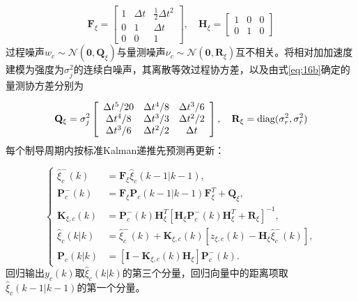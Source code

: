 \begin{equation}
\label{eq:62c}
{{\mathbf{F}}_\xi } = \left[ {\begin{array}{*{20}{c}}
  1&{\Delta t}&{\tfrac{1}{2}\Delta {t^2}} \\ 
  0&1&{\Delta t} \\ 
  0&0&1 
\end{array}} \right],\quad {{\mathbf{H}}_\xi } = \left[ {\begin{array}{*{20}{c}}
  1&0&0 \\ 
  0&1&0 
\end{array}} \right]
\end{equation}
过程噪声${w_c}\sim \mathcal{N}({\mathbf{0}},{{\mathbf{Q}}_\xi })$与量测噪声${\nu _c}\sim \mathcal{N}({\mathbf{0}},{{\mathbf{R}}_\xi })$互不相关。将相对加加速度建模为强度为$\sigma _j^2$的连续白噪声，其离散等效过程协方差，以及由式\eqref{eq:16b}确定的量测协方差分别为\cite{barshalom2001}

\begin{equation}
\label{eq:62d}
{{\mathbf{Q}}_\xi } = \sigma _j^2\left[ {\begin{array}{*{20}{c}}
  {\Delta {t^5}/20}&{\Delta {t^4}/8}&{\Delta {t^3}/6} \\ 
  {\Delta {t^4}/8}&{\Delta {t^3}/3}&{\Delta {t^2}/2} \\ 
  {\Delta {t^3}/6}&{\Delta {t^2}/2}&{\Delta t} 
\end{array}} \right],\quad {{\mathbf{R}}_\xi } = \diag(\sigma _r^2,\sigma _{\dot r}^2)
\end{equation}
每个制导周期内按标准Kalman递推先预测再更新\cite{barshalom2001}：

\begin{equation}
\label{eq:62e}
\left\{
\begin{aligned}
\hat \xi _c^-(k) &= {{\mathbf{F}}_\xi }{{\hat \xi }_c}(k - 1|k - 1),\\
{\mathbf{P}}_c^-(k) &= {{\mathbf{F}}_\xi }{{\mathbf{P}}_c}(k - 1|k - 1){\mathbf{F}}_\xi ^T + {{\mathbf{Q}}_\xi },\\
{{\mathbf{K}}_{\xi ,c}}(k) &= {\mathbf{P}}_c^-(k){\mathbf{H}}_\xi ^T
\left[ {\mathbf{H}}_\xi {\mathbf{P}}_c^-(k){\mathbf{H}}_\xi ^T + {\mathbf{R}}_\xi \right]^{-1},\\
{{\hat \xi }_c}(k|k) &= \hat \xi _c^-(k)+{{\mathbf{K}}_{\xi ,c}}(k)
\left[ {z_{\xi ,c}}(k)-{{\mathbf{H}}_\xi }\hat \xi _c^-(k) \right],\\
{{\mathbf{P}}_c}(k|k) &= \left[ {\mathbf{I}}-{{\mathbf{K}}_{\xi ,c}}(k){{\mathbf{H}}_\xi } \right]{\mathbf{P}}_c^-(k).
\end{aligned}
\right.
\end{equation}
回归输出${y_c}(k)$取${\hat \xi _c}(k|k)$的第三个分量，回归向量中的距离项取${\hat \xi _c}(k - 1|k - 1)$的第一个分量。

